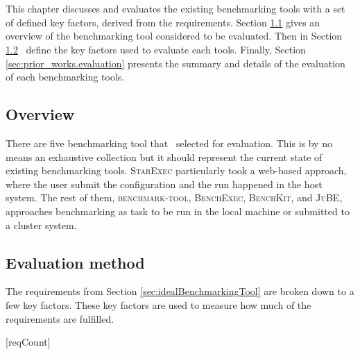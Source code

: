 \chapter{\babTiga}
\label{ch:priorWorks}

This chapter discusses and evaluates the existing benchmarking tools with a set of defined key factors, derived from the requirements.
Section \ref{sec:prior_works.overview} gives an overview of the benchmarking tool considered to be evaluated.
Then in Section \ref{sec:prior_works.method} \first~define the key factors used to evaluate each tools.
Finally, Section \ref{sec:prior_works.evaluation} presents the summary and details of the evaluation of each benchmarking tools.


\section{Overview}
\label{sec:prior_works.overview}

There are five benchmarking tool that \first~selected for evaluation.
This is by no means an exhaustive collection but it should represent the current state of existing benchmarking tools.
\textsc{StarExec} particularly took a web-based approach, where the user submit the configuration and the run happened in the host system.
The rest of them, \textsc{benchmark-tool}, \textsc{BenchExec}, \textsc{BenchKit}, and \textsc{JuBE}, approaches benchmarking as task to be run in the local machine or submitted to a cluster system.


\section{Evaluation method}
\label{sec:prior_works.method}

The requirements from Section \ref{sec:idealBenchmarkingTool} are broken down to a few key factors.
These key factors are used to measure how much of the requirements are fulfilled.

[reqCount]
\newcommand{\reqLabel}[1]{
	\setcounter{reqFactorCount}{0}
	\addtocounter{reqCount}{1}
	\arabic{reqCount}.
	#1
}
\newcommand{\reqFactor}[1]{
	\addtocounter{reqFactorCount}{1}
	(\alph{reqFactorCount}) #1
}

